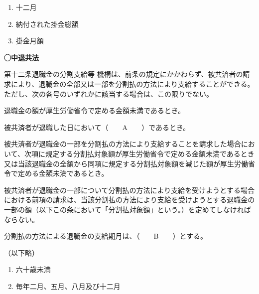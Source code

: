 \begin{answerbox}
  \begin{enumerate}[A:]
    \item 十二月
    \item 納付された掛金総額
    \item 掛金月額
  \end{enumerate}
\end{answerbox}

\begin{fillblank}[数理人試験 2020 問題1 設問6 D,E]
  \noindent \textbf{◯中退共法}
  \begin{lawstructure}
    \begin{lawarticle}{第十二条}{退職金の分割支給等}
      機構は、前条の規定にかかわらず、被共済者の請求により、退職金の全部又は一部を分割払の方法により支給することができる。ただし、次の各号のいずれかに該当する場合は、この限りでない。

      退職金の額が厚生労働省令で定める金額未満であるとき。

被共済者が退職した日において（　　A　　）であるとき。

被共済者が退職金の一部を分割払の方法により支給することを請求した場合において、次項に規定する分割払対象額が厚生労働省令で定める金額未満であるとき又は当該退職金の全額から同項に規定する分割払対象額を減じた額が厚生労働省令で定める金額未満であるとき。

被共済者が退職金の一部について分割払の方法により支給を受けようとする場合における前項の請求は、当該分割払の方法により支給を受けようとする退職金の一部の額（以下この条において「分割払対象額」という。）を定めてしなければならない。

分割払の方法による退職金の支給期月は、（　　B　　）とする。

（以下略）
    \end{lawarticle}
  \end{lawstructure}
\end{fillblank}

\begin{answerbox}
  \begin{enumerate}[A:]
    \item 六十歳未満
    \item 毎年二月、五月、八月及び十二月
  \end{enumerate}
\end{answerbox}


